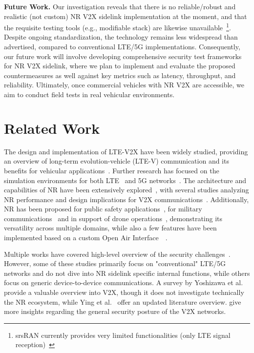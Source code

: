 \textbf{Future Work.} Our investigation reveals that there is no reliable/robust and realistic (not custom) NR V2X sidelink implementation at the moment, and that the requisite testing tools (e.g., modifiable stack) are likewise unavailable~\footnote{srsRAN currently provides very limited functionalities (only LTE signal reception)~\cite{srsran}}. Despite ongoing standardization, the technology remains less widespread than advertised, compared to conventional LTE/5G implementations. Consequently, our future work will involve developing comprehensive security test frameworks for NR V2X sidelink, where we plan to implement and evaluate the proposed countermeasures as well against key metrics such as latency, throughput, and reliability. Ultimately, once commercial vehicles with NR V2X are accessible, we aim to conduct field tests in real vehicular environments.

\section{Related Work} \label{sec:related-work}

The design and implementation of LTE-V2X have been widely studied, providing an overview of long-term evolution-vehicle (LTE-V) communication and its benefits for vehicular applications~\cite{Molina17LTEVFS, bazzi21V2X, liu15cellular, Chen17v2x, Asadi14survey}. Further research has focused on the simulation environments for both LTE~\cite{Virdis16simu} and 5G networks~\cite{Liu22nr}. The architecture and capabilities of NR have been extensively explored~\cite{Garcia21tutorial}, with several studies analyzing NR performance and design implications for V2X communications~\cite{Bagheri21nr, Todisco21PerformanceAO, Tabassum23nr, Ganesan20v2x, Liu22nr}. Additionally, NR has been proposed for public safety applications~\cite{Chukhno23nr}, for military communications~\cite{Bajracharya23:military} and in support of drone operations~\cite{Mishra22CooperativeCU}, demonstrating its versatility across multiple domains, while also a few features have been implemented based on a custom Open Air Interface~\cite{elkadi23opensource5g}~\cite{oai}.

Multiple works have covered high-level overview of the security challenges~\cite{Lu20secoverview, Huang20advances, Luo20phy, alnasser19challengessolutions, marojevic18requirementsprocedures, Mohan22threats, Boualouache23challenges, GHOSAL20:V2X-Survey, Lai20:Challenges}. However, some of these studies primarily focus on "conventional" LTE/5G networks and do not dive into NR sidelink specific internal functions, while others focus on generic device-to-device communications. A survey by Yoshizawa et al.~\cite{Yoshizawa23v2xsurvey} provide a valuable overview into V2X, though it does not investigate technically the NR ecosystem, while Ying et al.~\cite{Ying24review} offer an updated literature overview. \cite{Sedar23survey, Hasan20v2x} give more insights regarding the general security posture of the V2X networks.

